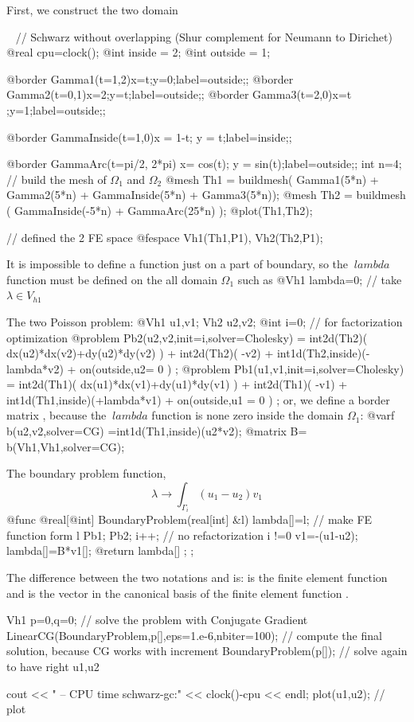\documentclass[a4paper,twoside,12pt]{book}
\begin{document}
First, we construct the two domain
\begin{example}~
\bFF
// Schwarz without overlapping (Shur complement  for Neumann to Dirichet)
@real cpu=clock();
@int inside = 2;
@int outside = 1;

@border Gamma1(t=1,2){x=t;y=0;label=outside;};
@border Gamma2(t=0,1){x=2;y=t;label=outside;};
@border Gamma3(t=2,0){x=t ;y=1;label=outside;};

@border GammaInside(t=1,0){x = 1-t; y = t;label=inside;};

@border GammaArc(t=pi/2, 2*pi){ x= cos(t); y = sin(t);label=outside;};
int n=4;
//  build the mesh of $\Omega_1$ and $\Omega_2$
@mesh Th1 = buildmesh( Gamma1(5*n) + Gamma2(5*n) + GammaInside(5*n) + Gamma3(5*n));
@mesh Th2 = buildmesh ( GammaInside(-5*n) + GammaArc(25*n) );
@plot(Th1,Th2);

// defined the 2 FE space
@fespace Vh1(Th1,P1),      Vh2(Th2,P1);
\eFF
\begin{note}
It is impossible to
define a function just on a part of boundary, so the $\ lambda $
function must be defined on the all domain $\Omega_1$
such as
\bFF
@Vh1 lambda=0;  // take $\lambda \in V_{h1}$
\eFF
\end{note}

The two Poisson problem:
\bFF
@Vh1 u1,v1;              Vh2 u2,v2;
@int i=0;  // for factorization optimization
@problem Pb2(u2,v2,init=i,solver=Cholesky) =
    int2d(Th2)( dx(u2)*dx(v2)+dy(u2)*dy(v2) )
  + int2d(Th2)( -v2)
  + int1d(Th2,inside)(-lambda*v2) +    on(outside,u2= 0 ) ;
@problem Pb1(u1,v1,init=i,solver=Cholesky) =
    int2d(Th1)( dx(u1)*dx(v1)+dy(u1)*dy(v1) )
  + int2d(Th1)( -v1)
  + int1d(Th1,inside)(+lambda*v1) +    on(outside,u1 = 0 ) ;
\eFF
or, we define a border matrix , because the
 $\ lambda $ function is none zero inside the domain $\Omega_1$:
\bFF
@varf b(u2,v2,solver=CG) =int1d(Th1,inside)(u2*v2);
@matrix B= b(Vh1,Vh1,solver=CG);
\eFF

The boundary problem function,
  $$
  \lambda \longrightarrow  \int_{\Gamma_i }(u_1-u_2) v_{1}
$$
\bFF
@func @real[@int] BoundaryProblem(real[int] &l)
{
   lambda[]=l; // make FE function form l
   Pb1;     Pb2;
   i++;  //  no  refactorization i !=0
   v1=-(u1-u2);
   lambda[]=B*v1[];
   @return lambda[] ;
};
\eFF
\begin{note}
The  difference between the two notations  and   is:
  is the finite element  function and 
is the vector in the canonical basis of the   finite element  function   .
\end{note}
\bFF
Vh1 p=0,q=0;
//  solve the problem with Conjugate Gradient
LinearCG(BoundaryProblem,p[],eps=1.e-6,nbiter=100);
//  compute the final solution, because CG works with increment
BoundaryProblem(p[]); // solve again  to have right u1,u2

cout << " -- CPU time  schwarz-gc:" <<  clock()-cpu << endl;
plot(u1,u2); // plot
\eFF
\end{example}
\end{document}
